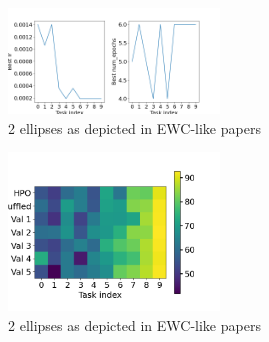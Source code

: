 \documentclass[11pt]{article}
\begin{document}
\begin{figure}
    \centering
    \includegraphics[width=0.5\textwidth]{images/best_params_greedy_HPO_GroHess_from_output_pMNIST_via_torch_standard_2024-07-16_20-41-35.png}
    \caption{2 ellipses as depicted in EWC-like papers}
    \label{fig:best_params}
\end{figure}

\begin{figure}
    \centering
    \includegraphics[width=0.5\textwidth]{images/val_accs_matrix_greedy_HPO_GroHess_from_output_pMNIST_via_torch_standard_2024-07-16_20-54-00.png}
    \caption{2 ellipses as depicted in EWC-like papers}
    \label{fig:best_params}
\end{figure}
\end{document}
